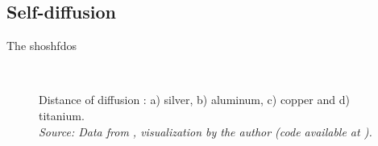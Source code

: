 \subsection{Self-diffusion}

The shoshfdos

\begin{figure}[H]
 \centering
 \captionsetup{justification=centering}
   \\
 \caption{Distance of diffusion : a) silver, b) aluminum, c) copper and d) titanium.\\ 
 \textit{Source: Data from \citep{kakusan}, visualization by the author (code available at \citep{mygit}).}}
 \label{fig:selfdiff_lnd}
\end{figure}



